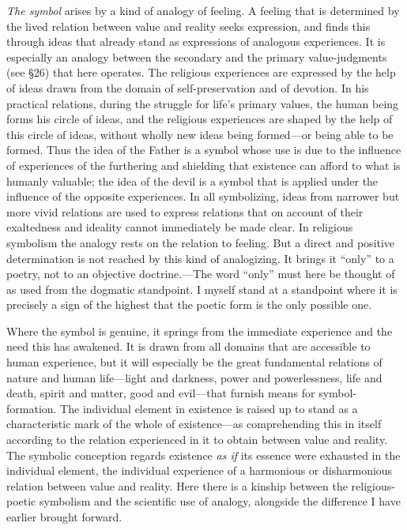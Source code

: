 \documentclass[12pt,a4paper]{book}
\newcommand{\opage}[1]{\marginnote{\footnotesize\textit{[#1]}}}
\begin{document}
\opage{139}\emph{The symbol} arises by a kind of analogy of feeling. A feeling that is determined by the lived
relation between value and reality seeks expression, and finds this through ideas that already stand as
expressions of analogous experiences. It is especially an analogy between the secondary and the primary
value-judgments (see §26) that here operates. The religious experiences are expressed by the help of
ideas drawn from the domain of self-preservation and of devotion. In his practical relations, during the
struggle for life's primary values, the human being forms his circle of ideas, and the religious
experiences are shaped by the help of this circle of ideas, without wholly new ideas being formed---or
being able to be formed. Thus the idea of the Father is a symbol whose use is due to the influence of
experiences of the furthering and shielding that existence can afford to what is humanly valuable; the
idea of the devil is a symbol that is applied under the influence of the opposite experiences. In all
symbolizing, ideas from narrower but more vivid relations are used to express relations that on account
of their exaltedness and ideality cannot immediately be made clear. In religious symbolism the analogy
rests on the relation to feeling. But a direct and positive determination is not reached by this kind of
analogizing. It brings it ``only'' to a poetry, not to an objective doctrine.---The word ``only'' must
here be thought of as used from the dogmatic standpoint. I myself stand at a standpoint where it is
precisely a sign of the highest that the poetic form is the only possible one.

Where the symbol is genuine, it springs from the immediate experience and the need this has awakened. It
is drawn from all domains that are accessible to human experience, but it will especially be the great
fundamental relations of nature and human life---light and darkness, power and powerlessness, life and
death, spirit and matter, good and evil---that furnish means for symbol-formation. The individual element
in existence is raised up to stand as a characteristic mark of the whole of existence---as comprehending
this in itself according to the relation experienced in it to obtain between value and reality. The
symbolic conception regards existence \emph{as if} its essence were exhausted in the individual element,
the individual experience of a harmonious or disharmonious relation between value and reality. Here there
is a kinship between the religious-poetic symbolism and the scientific use of analogy, alongside the
difference I have earlier brought forward.
\end{document}
